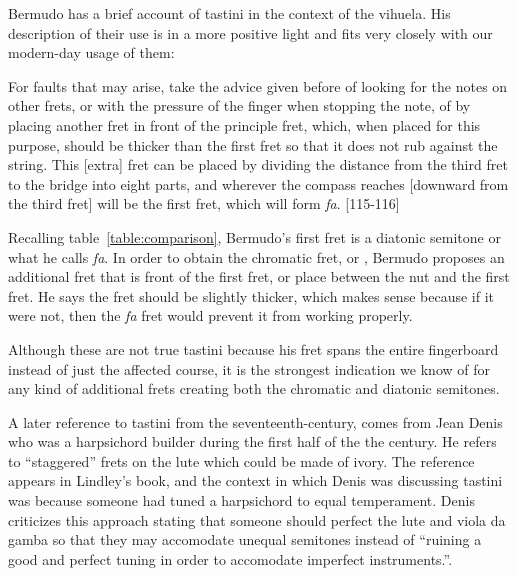 Bermudo has a brief account of tastini in the context of the vihuela.  His description
of their use is in a more positive light and fits very closely with our modern-day
usage of them:
\begin{blocks}
For faults that may arise, take the advice given before of looking for the notes on other
frets, or with the pressure of the finger when stopping the note, of by placing another
fret in front of the principle fret, which, when placed for this purpose, should be
thicker than the first fret so that it does not rub against the string. This [extra]
fret can be placed by dividing the distance from the third fret to the bridge into eight
parts, and wherever the compass reaches [downward from the third fret] will be the first
fret, which will form \textit{fa}. \autocite{DE:1}[115-116]
\end{blocks}
Recalling table~\ref{table:comparison}, Bermudo's first fret is a diatonic semitone or what
he calls \textit{fa}.  In order to obtain the chromatic fret, or , Bermudo
proposes an additional fret that is front of the first fret, or place between the nut
and the first fret.  He says the fret should be slightly thicker, which makes sense
because if it were not, then the \textit{fa} fret would prevent it from working
properly.

Although these are not true tastini because his fret spans the entire
fingerboard instead of just the affected course, it is the strongest indication we know
of for any kind of additional frets creating both the chromatic and diatonic semitones.

A later reference to tastini from the seventeenth-century, comes from Jean Denis who
was a harpsichord builder during the first half of the the century.  He refers to
``staggered'' frets on the lute which could be made of ivory.  The reference appears in
Lindley's book, and the context in which Denis was discussing tastini was because
someone had tuned a harpsichord to equal temperament.  Denis criticizes this approach
stating that someone should perfect the lute and viola da gamba so that they may
accomodate unequal semitones instead of ``ruining a good and perfect tuning in order to
accomodate imperfect instruments.''\autocite[47]{ML:1}.

